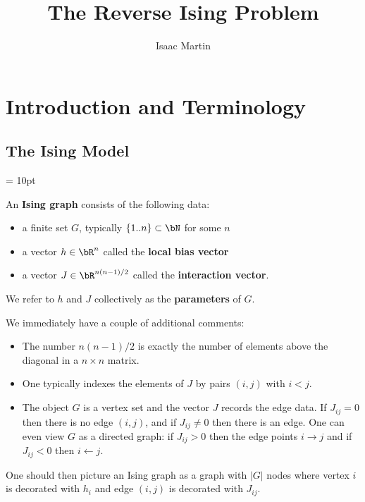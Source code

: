 \documentclass[raggedright, nofonts, notitlepage, openany, debug]{tufte-book}
\begin{document}
\newpage
\title{The Reverse Ising Problem}
\author{Isaac Martin}
\maketitle

\chapter{Introduction and Terminology}
\section{The Ising Model}

\hfuzz = 10pt



\begin{defn}
  An \textbf{Ising graph} consists of the following data:
  \begin{itemize}
    \item a finite set $G$, typically $\{1..n\}\subset \bN$ for some $n$
    \item a vector $h \in \bR^n$ called the  \textbf{local bias vector}
    \item a vector $J \in \bR^{n(n-1)/2}$ called the \textbf{interaction vector}.
  \end{itemize}
  We refer to $h$ and $J$ collectively as the \textbf{parameters} of $G$.
\end{defn}

We immediately have a couple of additional comments:
\begin{itemize}
  \item The number $n(n-1)/2$ is exactly the number of elements above the diagonal in a $n\times n$ matrix.
  \item One typically indexes the elements of $J$ by pairs $(i,j)$ with $i < j$.
  \item The object $G$ is a vertex set and the vector $J$ records the edge data. If $J_{ij} = 0$ then there is no edge $(i,j)$, and if $J_{ij} \neq 0$ then there is an edge. One can even view $G$ as a directed graph: if $J_{ij} > 0$ then the edge points $i\rightarrow j$ and if $J_{ij} < 0$ then $i \leftarrow j$.
\end{itemize}
One should then picture an Ising graph as a graph with $|G|$ nodes where vertex $i$ is decorated with $h_i$ and edge $(i,j)$ is decorated with $J_{ij}$.
\end{document}
